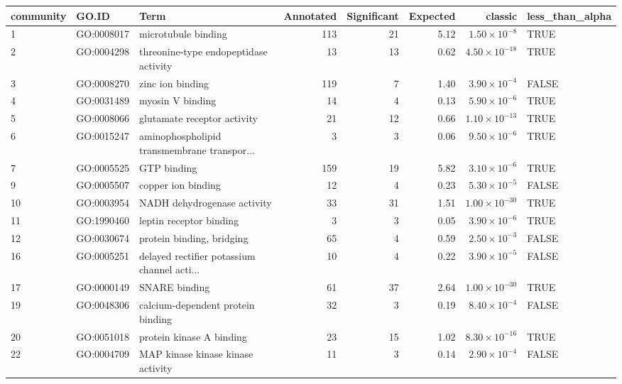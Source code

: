 \begin{table}[ht]
\centering
\begin{adjustbox}{max width=\textwidth}
\begin{tabular}{lllrrrrl}
  \hline
community & GO.ID & Term & Annotated & Significant & Expected & classic & less\_than\_alpha \\ 
  \hline
1 & GO:0008017 & microtubule binding & 113 & 21 & 5.12 & $1.50 \times 10^{-8}$ & TRUE \\ 
  2 & GO:0004298 & threonine-type endopeptidase activity & 13 & 13 & 0.62 & $4.50 \times 10^{-18}$ & TRUE \\ 
  3 & GO:0008270 & zinc ion binding & 119 & 7 & 1.40 & $3.90 \times 10^{-4}$ & FALSE \\ 
  4 & GO:0031489 & myosin V binding & 14 & 4 & 0.13 & $5.90 \times 10^{-6}$ & TRUE \\ 
  5 & GO:0008066 & glutamate receptor activity & 21 & 12 & 0.66 & $1.10 \times 10^{-13}$ & TRUE \\ 
  6 & GO:0015247 & aminophospholipid transmembrane transpor... & 3 & 3 & 0.06 & $9.50 \times 10^{-6}$ & TRUE \\ 
  7 & GO:0005525 & GTP binding & 159 & 19 & 5.82 & $3.10 \times 10^{-6}$ & TRUE \\ 
  9 & GO:0005507 & copper ion binding & 12 & 4 & 0.23 & $5.30 \times 10^{-5}$ & FALSE \\ 
  10 & GO:0003954 & NADH dehydrogenase activity & 33 & 31 & 1.51 & $1.00 \times 10^{-30}$ & TRUE \\ 
  11 & GO:1990460 & leptin receptor binding & 3 & 3 & 0.05 & $3.90 \times 10^{-6}$ & TRUE \\ 
  12 & GO:0030674 & protein binding, bridging & 65 & 4 & 0.59 & $2.50 \times 10^{-3}$ & FALSE \\ 
  16 & GO:0005251 & delayed rectifier potassium channel acti... & 10 & 4 & 0.22 & $3.90 \times 10^{-5}$ & FALSE \\ 
  17 & GO:0000149 & SNARE binding & 61 & 37 & 2.64 & $1.00 \times 10^{-30}$ & TRUE \\ 
  19 & GO:0048306 & calcium-dependent protein binding & 32 & 3 & 0.19 & $8.40 \times 10^{-4}$ & FALSE \\ 
  20 & GO:0051018 & protein kinase A binding & 23 & 15 & 1.02 & $8.30 \times 10^{-16}$ & TRUE \\ 
  22 & GO:0004709 & MAP kinase kinase kinase activity & 11 & 3 & 0.14 & $2.90 \times 10^{-4}$ & FALSE \\ 

\end{tabular}
\end{adjustbox}
\end{table}
